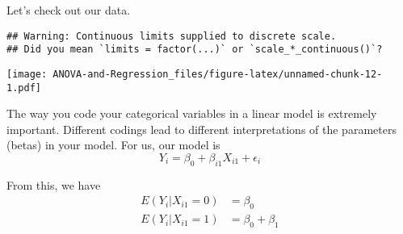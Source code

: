 \documentclass[
]{book}
\newenvironment{Shaded}{\begin{snugshade}}{\end{snugshade}}
\newcommand{\AttributeTok}[1]{\textcolor[rgb]{0.77,0.63,0.00}{#1}}
\newcommand{\CommentTok}[1]{\textcolor[rgb]{0.56,0.35,0.01}{\textit{#1}}}
\newcommand{\DecValTok}[1]{\textcolor[rgb]{0.00,0.00,0.81}{#1}}
\newcommand{\FloatTok}[1]{\textcolor[rgb]{0.00,0.00,0.81}{#1}}
\newcommand{\FunctionTok}[1]{\textcolor[rgb]{0.00,0.00,0.00}{#1}}
\newcommand{\NormalTok}[1]{#1}
\newcommand{\OtherTok}[1]{\textcolor[rgb]{0.56,0.35,0.01}{#1}}
\newcommand{\SpecialCharTok}[1]{\textcolor[rgb]{0.00,0.00,0.00}{#1}}
\newcommand{\StringTok}[1]{\textcolor[rgb]{0.31,0.60,0.02}{#1}}
\begin{document}
Let's check out our data.

\begin{Shaded}
\end{Shaded}

\begin{verbatim}
## Warning: Continuous limits supplied to discrete scale.
## Did you mean `limits = factor(...)` or `scale_*_continuous()`?
\end{verbatim}

\texttt{[image: ANOVA-and-Regression\_files/figure-latex/unnamed-chunk-12-1.pdf]}

The way you code your categorical variables in a linear model is
extremely important. Different codings lead to different interpretations
of the parameters (betas) in your model. For us, our model is
\[
Y_i = \beta_0+\beta_{i1}X_{i1}+\epsilon_i
\]

From this, we have
\[
\begin{aligned}
E(Y_i|X_{i1}=0) &=\beta_0 \\
E(Y_i|X_{i1}=1) &=\beta_0 + \beta_1
\end{aligned}
\]
\end{document}
